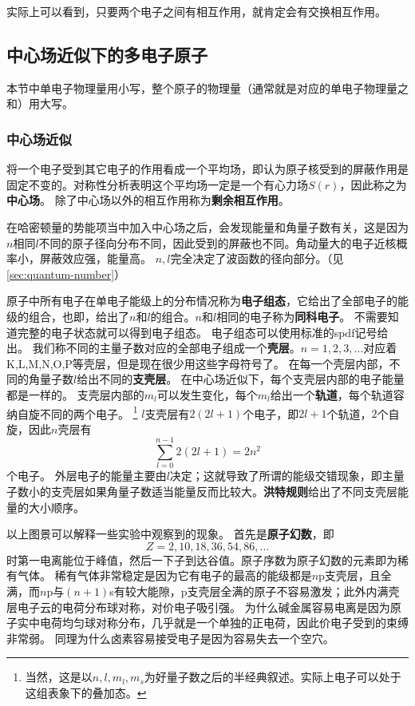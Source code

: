 \documentclass[UTF8, a4paper]{ctexart}
\begin{document}
实际上可以看到，只要两个电子之间有相互作用，就肯定会有交换相互作用。

\subsection{中心场近似下的多电子原子}

本节中单电子物理量用小写，整个原子的物理量（通常就是对应的单电子物理量之和）用大写。

\subsubsection{中心场近似}\label{sec:centric-field}

将一个电子受到其它电子的作用看成一个平均场，即认为原子核受到的屏蔽作用是固定不变的。对称性分析表明这个平均场一定是一个有心力场$S(r)$，因此称之为\textbf{中心场}。
除了中心场以外的相互作用称为\textbf{剩余相互作用}。

在哈密顿量的势能项当中加入中心场之后，会发现能量和角量子数有关，这是因为$n$相同$l$不同的原子径向分布不同，因此受到的屏蔽也不同。角动量大的电子近核概率小，屏蔽效应强，能量高。
$n, l$完全决定了波函数的径向部分。（见\autoref{sec:quantum-number}）

原子中所有电子在单电子能级上的分布情况称为\textbf{电子组态}，它给出了全部电子的能级的组合，也即，给出了$n$和$l$的组合。$n$和$l$相同的电子称为\textbf{同科电子}。
不需要知道完整的电子状态就可以得到电子组态。
电子组态可以使用标准的spdf记号给出。
我们称不同的主量子数对应的全部电子组成一个\textbf{壳层}。$n=1, 2, 3, \ldots$对应着K,L,M,N,O,P等壳层，但是现在很少用这些字母符号了。
在每一个壳层内部，不同的角量子数$l$给出不同的\textbf{支壳层}。
在中心场近似下，每个支壳层内部的电子能量都是一样的。
支壳层内部的$m_l$可以发生变化，每个$m_l$给出一个\textbf{轨道}，每个轨道容纳自旋不同的两个电子。%
\footnote{当然，这是以$n,l,m_l,m_s$为好量子数之后的半经典叙述。实际上电子可以处于这组表象下的叠加态。}%
$l$支壳层有$2(2l+1)$个电子，即$2l+1$个轨道，$2$个自旋，因此$n$壳层有
\[
    \sum_{l=0}^{n-1} 2(2l+1) = 2n^2
\]
个电子。
外层电子的能量主要由$l$决定；这就导致了所谓的能级交错现象，即主量子数小的支壳层如果角量子数适当能量反而比较大。\textbf{洪特规则}给出了不同支壳层能量的大小顺序。

以上图景可以解释一些实验中观察到的现象。
首先是\textbf{原子幻数}，即
\[
    Z=2, 10, 18, 36, 54, 86, \ldots
\]
时第一电离能位于峰值，然后一下子到达谷值。原子序数为原子幻数的元素即为稀有气体。
稀有气体非常稳定是因为它有电子的最高的能级都是$n$p支壳层，且全满，而$n$p与$(n+1)$s有较大能隙，p支壳层全满的原子不容易激发；此外内满壳层电子云的电荷分布球对称，对价电子吸引强。
为什么碱金属容易电离是因为原子实中电荷均匀球对称分布，几乎就是一个单独的正电荷，因此价电子受到的束缚非常弱。
同理为什么卤素容易接受电子是因为容易失去一个空穴。
\end{document}
